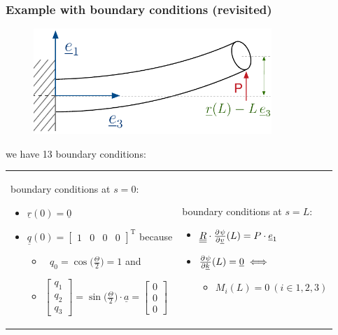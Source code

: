 \begin{frame}
  \frametitle{Example with boundary conditions (revisited)}

  \begin{figure}
    \centering
    \includegraphics[width=9cm, keepaspectratio=true]{sections/cosserat_rods/images/MinimumPotentialEnergyMethodExample}
  \end{figure}
  
  \vspace{0.7em}
  we have 13 boundary conditions:
  
  \vspace{0.5em}
  \begin{tabularx}{\linewidth}{XX}
    {
      boundary conditions at $s=0$:
      \begin{itemize}
        \item $\underline{r}(0) = \underline{0}$
        \item $\underline{q}(0) =
          \begin{bmatrix}
            1 & 0 & 0 & 0
          \end{bmatrix}^{\mathrm{T}}$ because
          \begin{itemize}
            \item $\: \: \, q_0 = \cos\bigl( \frac{\Theta}{2} \bigr) = 1$ and
            \item $\begin{bmatrix}
            q_1 \\ q_2 \\ q_3
          \end{bmatrix} = \sin \bigl( \frac{\Theta}{2} \bigr) \cdot \underline{a} =
          \begin{bmatrix}
            0 \\ 0 \\ 0
          \end{bmatrix}$
        \end{itemize}
      \end{itemize}
    } & {
      boundary conditions at $s=L$:
      \begin{itemize}
        \item $\doubleunderline{R} \cdot \pd{\psi}{\underline{v}}(L) = P \cdot \underline{e}_1$
        \item $\pd{\psi}{\underline{k}}(L) = \underline{0} \iff$
          \begin{itemize}
            \item $M_i(L) = 0 \: (i \in {1,2,3})$
          \end{itemize}
      \end{itemize}
    }
  \end{tabularx}
\end{frame}


